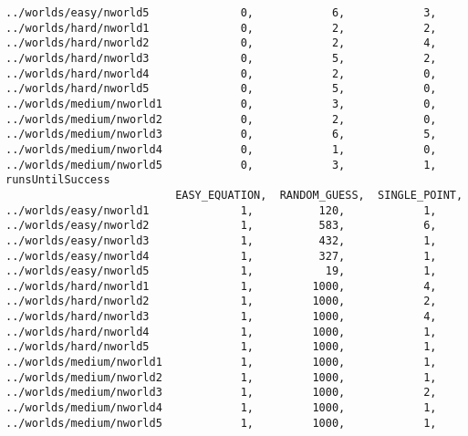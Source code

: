 \documentclass[british]{article}
\begin{document}
\begin{lstlisting}
../worlds/easy/nworld5              0,            6,            3,
../worlds/hard/nworld1              0,            2,            2,
../worlds/hard/nworld2              0,            2,            4,
../worlds/hard/nworld3              0,            5,            2,
../worlds/hard/nworld4              0,            2,            0,
../worlds/hard/nworld5              0,            5,            0,
../worlds/medium/nworld1            0,            3,            0,
../worlds/medium/nworld2            0,            2,            0,
../worlds/medium/nworld3            0,            6,            5,
../worlds/medium/nworld4            0,            1,            0,
../worlds/medium/nworld5            0,            3,            1,
runsUntilSuccess
                          EASY_EQUATION,  RANDOM_GUESS,  SINGLE_POINT,
../worlds/easy/nworld1              1,          120,            1,
../worlds/easy/nworld2              1,          583,            6,
../worlds/easy/nworld3              1,          432,            1,
../worlds/easy/nworld4              1,          327,            1,
../worlds/easy/nworld5              1,           19,            1,
../worlds/hard/nworld1              1,         1000,            4,
../worlds/hard/nworld2              1,         1000,            2,
../worlds/hard/nworld3              1,         1000,            4,
../worlds/hard/nworld4              1,         1000,            1,
../worlds/hard/nworld5              1,         1000,            1,
../worlds/medium/nworld1            1,         1000,            1,
../worlds/medium/nworld2            1,         1000,            1,
../worlds/medium/nworld3            1,         1000,            2,
../worlds/medium/nworld4            1,         1000,            1,
../worlds/medium/nworld5            1,         1000,            1,
\end{lstlisting}
\end{document}
